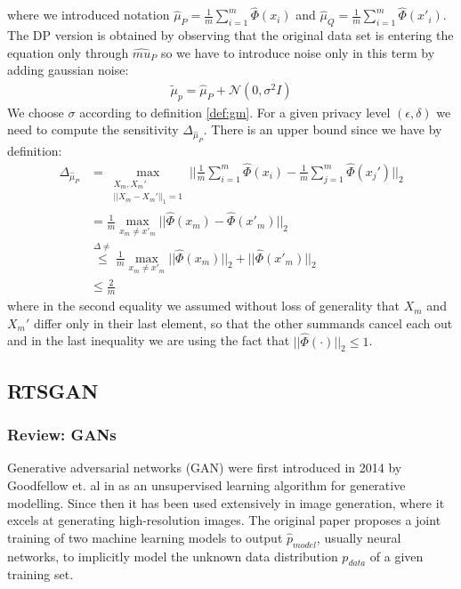 where we introduced notation $\hat{\mu}_P = \frac{1}{m} \sum_{i=1}^m \hat{\Phi}(x_i)$ and $\hat{\mu}_Q = \frac{1}{m} \sum_{i=1}^m \hat{\Phi}(x'_i)$. The DP version is obtained by observing that the original data set is entering the equation only through $\hat{mu}_P$ so we have to introduce noise only in this term by adding gaussian noise:
\begin{align}
    \tilde{\mu}_p = \hat{\mu}_P + \mathcal{N}(0, \sigma^2 I)
\end{align}
We choose $\sigma$ according to definition \ref{def:gm}. For a given privacy level $(\epsilon, \delta)$ we need to compute the sensitivity $\Delta_{\hat{\mu}_P}$. There is an upper bound since we have by definition:
\begin{align}
    \Delta_{\hat{\mu}_P} &= \max_{\substack{X_m,X_m' \\ ||X_m-X_m'||_1=1}} || \frac{1}{m} \sum_{i=1}^m \hat{\Phi}(x_i) - \frac{1}{m} \sum_{j=1}^m \hat{\Phi}(x_j') ||_2 \nonumber \\
    &= \frac{1}{m} \max_{x_m \neq x'_m} || \hat{\Phi}(x_m) - \hat{\Phi}(x'_m)||_2 \nonumber \\
    &\overset{\Delta \neq}{\leq} \frac{1}{m} \max_{x_m \neq x'_m} || \hat{\Phi}(x_m) ||_2 + ||\hat{\Phi}(x'_m)||_2 \nonumber \\
    &\leq \frac{2}{m} 
\end{align}
where in the second equality we assumed without loss of generality that $X_m$ and $X_m'$ differ only in their last element, so that the other summands cancel each out and in the last inequality we are using the fact that $||\hat{\Phi}(\cdot)||_2 \leq 1$.


\subsection{RTSGAN} 

\subsubsection{Review: GANs}
Generative adversarial networks (GAN) were first introduced in 2014 by Goodfellow et. al in \parencite{gan_og} as an unsupervised learning algorithm for generative modelling. Since then it has been used extensively in image generation, where it excels at generating high-resolution images. The original paper proposes a joint training of two machine learning models to output $\hat{p}_{model}$, usually neural networks, to implicitly model the unknown data distribution $p_{data}$ of a given training set. 

